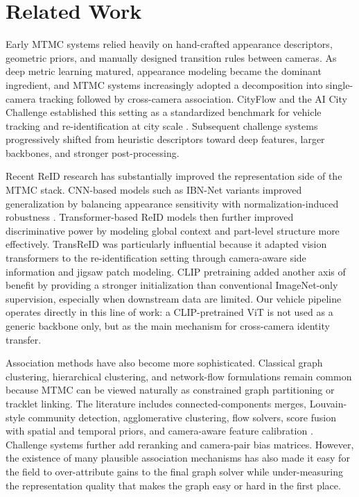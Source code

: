 \documentclass{ieeeaccess}
\begin{document}
\section{Related Work}
Early MTMC systems relied heavily on hand-crafted appearance descriptors, geometric priors, and manually designed transition rules between cameras. As deep metric learning matured, appearance modeling became the dominant ingredient, and MTMC systems increasingly adopted a decomposition into single-camera tracking followed by cross-camera association. CityFlow and the AI City Challenge established this setting as a standardized benchmark for vehicle tracking and re-identification at city scale \cite{cityflow,aicity2022}. Subsequent challenge systems progressively shifted from heuristic descriptors toward deep features, larger backbones, and stronger post-processing.

Recent ReID research has substantially improved the representation side of the MTMC stack. CNN-based models such as IBN-Net variants improved generalization by balancing appearance sensitivity with normalization-induced robustness \cite{ibnnet}. Transformer-based ReID models then further improved discriminative power by modeling global context and part-level structure more effectively. TransReID \cite{transreid} was particularly influential because it adapted vision transformers to the re-identification setting through camera-aware side information and jigsaw patch modeling. CLIP pretraining \cite{clip} added another axis of benefit by providing a stronger initialization than conventional ImageNet-only supervision, especially when downstream data are limited. Our vehicle pipeline operates directly in this line of work: a CLIP-pretrained ViT is not used as a generic backbone only, but as the main mechanism for cross-camera identity transfer.

Association methods have also become more sophisticated. Classical graph clustering, hierarchical clustering, and network-flow formulations remain common because MTMC can be viewed naturally as constrained graph partitioning or tracklet linking. The literature includes connected-components merges, Louvain-style community detection, agglomerative clustering, flow solvers, score fusion with spatial and temporal priors, and camera-aware feature calibration \cite{mtmc2021,scorebased,aic22sta,camawarefic}. Challenge systems further add reranking and camera-pair bias matrices. However, the existence of many plausible association mechanisms has also made it easy for the field to over-attribute gains to the final graph solver while under-measuring the representation quality that makes the graph easy or hard in the first place.
\end{document}
